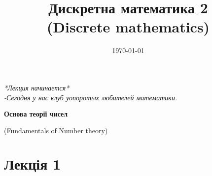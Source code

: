 \documentclass[a4paper,12pt, centered]{bookest}
\title{Дискретна математика 2\\ \small (Discrete mathematics)
}
\date{\today}
\begin{document}
\maketitle
\vspace*{\fill}
\begin{flushright}
\emph{*Лекция начинается*}\\
\emph{-Сегодня у нас клуб уопоротых любителей математики.}
\end{flushright}
\let\cleardoublepage\clearpage
\tableofcontents
\newpage
\thispagestyle{empty}
\hspace{0pt}
\vfill
\begin{center}
	\LARGE{\textbf{Основа теорії чисел}}
\end{center}
\begin{center}
	(Fundamentals of Number theory)
\end{center}
\vfill
\hspace{0pt}
\pagebreak
\newpage
\chapter{Лекція 1}
\end{document}

